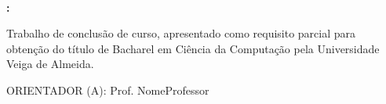 
\begin{center}

    \thispagestyle{pretext}
    \ \\ 

    \begin{large}
        \printAuthors
    \end{large}
    

    \vfill

    \begin{Large}
        \textbf{\uppercase\expandafter{\TitleName}:} \\
        \textbf{\uppercase\expandafter{\SubtitleName}}
    \end{Large}

\end{center}

\vspace{3em}

\begin{adjustwidth}{7.5cm}{}
    \noindent Trabalho de conclusão de curso, apresentado como requisito parcial para obtenção do título de Bacharel em Ciência da Computação pela Universidade Veiga de Almeida.
\end{adjustwidth}

\vspace{2cm}

ORIENTADOR (A): Prof. NomeProfessor

\vfill

\begin{center}
    \begin{large}
        \printCity \\
        \the \year
    \end{large}
\end{center}

\newpage